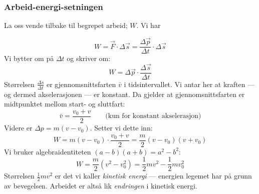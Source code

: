 \subsubsection{Arbeid-energi-setningen}
La oss vende tilbake til begrepet arbeid; $W.$ Vi har 

\[
W = \vec{F}\cdot \Delta\vec{s} = \frac{\Delta\vec{p}}{\Delta t}\cdot\Delta\vec{s}
\]
Vi bytter om på $\Delta t$ og skriver om:
\[
W = \Delta\vec{p} \cdot \frac{\Delta\vec{s}}{\Delta t}
\]
Størrelsen $\frac{\Delta s}{\Delta t}$ er gjennomsnittsfarten $\bar{v}$ i tidsintervallet. Vi antar her at kraften — og dermed akselerasjonen — er konstant. Da gjelder at gjennomsnittsfarten er midtpunktet mellom start- og sluttfart:
\[
\bar{v} = \frac{v_0 + v}{2} \qquad \text{(kun for konstant akselerasjon)}
\]
Videre er $\Delta p = m(v - v_0)$. Setter vi dette inn:
\[
W = m(v - v_0)\cdot\frac{v_0 + v}{2} = \frac{m}{2}(v - v_0)(v + v_0)
\]
Vi bruker algebraidentiteten $(a - b)(a + b) = a^2 - b^2$:
\[
W = \frac{m}{2}(v^2 - v_0^2) = \frac{1}{2}mv^2 - \frac{1}{2}mv_0^2
\]
Størrelsen $\frac{1}{2}mv^2$ er det vi kaller \textit{kinetisk energi} — energien legemet har på grunn av bevegelsen. Arbeidet er altså lik \textit{endringen} i kinetisk energi.
\noindent




\medskip

